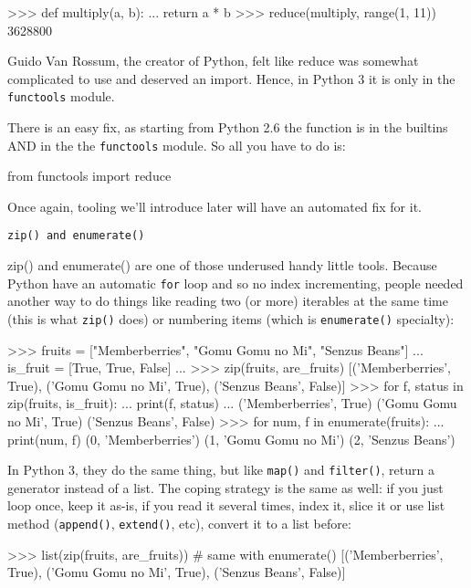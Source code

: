 \begin{py2}
>>> def multiply(a, b):
...     return a * b
>>> reduce(multiply, range(1, 11))
3628800
\end{py2}

Guido Van Rossum, the creator of Python, felt like reduce was somewhat complicated to use and deserved an import. Hence, in Python 3 it is only in the \lstinline{functools} module.

There is an easy fix, as starting from Python 2.6 the function is in the builtins AND in the the \lstinline{functools} module. So all you have to do is:

\begin{py2and3}
from functools import reduce
\end{py2and3}

Once again, tooling we'll introduce later will have an automated fix for it.

\lstinline{zip() and enumerate()}

{zip()} and enumerate() are one of those underused handy little tools. Because Python have an automatic \lstinline{for} loop and so no index incrementing, people needed another way to do things like reading two (or more) \glspl{iterable} at the same time (this is what \lstinline{zip()} does) or numbering items (which is \lstinline{enumerate()} specialty):

\begin{py2}
>>> fruits = ["Memberberries", "Gomu Gomu no Mi", "Senzus Beans"]
... is_fruit = [True, True, False]
...
>>> zip(fruits, are_fruits)
[('Memberberries', True), ('Gomu Gomu no Mi', True), ('Senzus Beans', False)]
>>> for f, status in zip(fruits, is_fruit):
...     print(f, status)
...
('Memberberries', True)
('Gomu Gomu no Mi', True)
('Senzus Beans', False)
>>> for num, f in enumerate(fruits):
...     print(num, f)
(0, 'Memberberries')
(1, 'Gomu Gomu no Mi')
(2, 'Senzus Beans')
\end{py2}

In Python 3, they do the same thing, but like \lstinline{map()} and \lstinline{filter()}, return a generator instead of a list. The coping strategy is the same as well: if you just loop once, keep it as-is, if you read it several times, index it, slice it or use list method (\lstinline{append()}, \lstinline{extend()}, etc), convert it to a list before:

\begin{py2and3}
>>> list(zip(fruits, are_fruits)) # same with enumerate()
[('Memberberries', True), ('Gomu Gomu no Mi', True), ('Senzus Beans', False)]
\end{py2and3}

